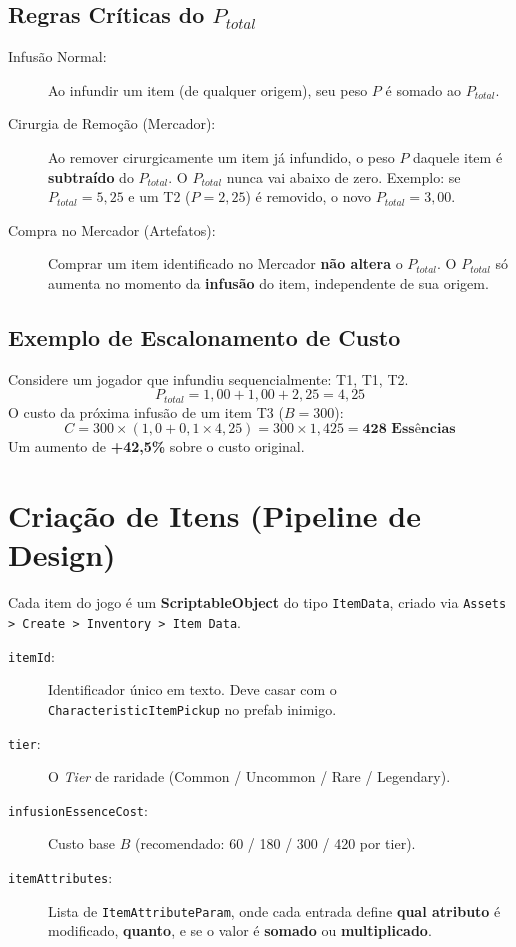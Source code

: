 \documentclass[a4paper,12pt]{report}
\begin{document}
\subsection{Regras Críticas do $P_{total}$}

\begin{description}
    \item[Infusão Normal:] Ao infundir um item (de qualquer origem), seu peso $P$ é somado ao $P_{total}$.
    \item[Cirurgia de Remoção (Mercador):] Ao remover cirurgicamente um item já infundido, o peso $P$ daquele item é \textbf{subtraído} do $P_{total}$. O $P_{total}$ nunca vai abaixo de zero. Exemplo: se $P_{total} = 5{,}25$ e um T2 ($P = 2{,}25$) é removido, o novo $P_{total} = 3{,}00$.
    \item[Compra no Mercador (Artefatos):] Comprar um item identificado no Mercador \textbf{não altera} o $P_{total}$. O $P_{total}$ só aumenta no momento da \textbf{infusão} do item, independente de sua origem.
\end{description}

\subsection{Exemplo de Escalonamento de Custo}
Considere um jogador que infundiu sequencialmente: T1, T1, T2.
\[
P_{total} = 1{,}00 + 1{,}00 + 2{,}25 = 4{,}25
\]
O custo da próxima infusão de um item T3 ($B = 300$):
\[
C = 300 \times (1{,}0 + 0{,}1 \times 4{,}25) = 300 \times 1{,}425 = \textbf{428 Essências}
\]
Um aumento de \textbf{+42,5\%} sobre o custo original.

\section{Criação de Itens (Pipeline de Design)}
Cada item do jogo é um \textbf{ScriptableObject} do tipo \texttt{ItemData}, criado via \texttt{Assets > Create > Inventory > Item Data}.

\begin{description}
    \item[\texttt{itemId}:] Identificador único em texto. Deve casar com o \texttt{CharacteristicItemPickup} no prefab inimigo.
    \item[\texttt{tier}:] O \textit{Tier} de raridade (Common / Uncommon / Rare / Legendary).
    \item[\texttt{infusionEssenceCost}:] Custo base $B$ (recomendado: 60 / 180 / 300 / 420 por tier).
    \item[\texttt{itemAttributes}:] Lista de \texttt{ItemAttributeParam}, onde cada entrada define \textbf{qual atributo} é modificado, \textbf{quanto}, e se o valor é \textbf{somado} ou \textbf{multiplicado}.
\end{description}
\end{document}
